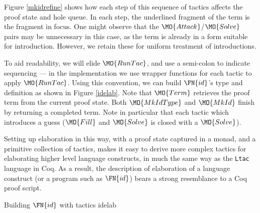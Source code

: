 Figure \ref{mkidrefine} shows how each step of this sequence of tactics affects
the proof state and hole queue. In each step, the underlined fragment of the
term is the fragment in focus. One might observe that the 
$\MO{Attack}$/$\MO{Solve}$ pairs may be unnecessary in this case, as the term
is already in a form suitable for introduction. However, we retain these for
uniform treatment of introductions.

To aid readability, we will elide $\MO{RunTac}$, and use a semi-colon to indicate
sequencing --- in the implementation we use wrapper functions for each tactic to
apply $\MO{RunTac}$.
Using this convention, we can build $\FN{id}$'s type and definition as shown
in Figure \ref{idelab}. Note that $\MO{Term}$ retrieves the proof term from the current proof
state. Both $\MO{MkIdType}$ and $\MO{MkId}$ finish by returning a completed \TT{} term.
Note in particular that each tactic which introduces a guess ($\MO{Fill}$ 
and $\MO{Solve}$ is closed with a $\MO{Solve}$).

Setting up elaboration in this way, with a proof state captured in a monad,
and a primitive collection of tactics,
makes it easy to derive more complex tactics for elaborating higher level language constructs,
in much the same way as the \texttt{Ltac} language in Coq. As a result, the
description of elaboration of
a language construct (or a program such as $\FN{id}$) bears a strong resemblance to
a Coq proof script.

{Building $\FN{id}$ with tactics}
{idelab}


                             
